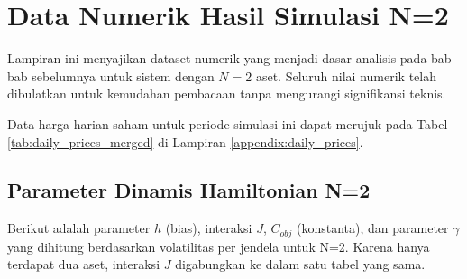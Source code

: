 \chapter{Data Numerik Hasil Simulasi N=2}
\label{appendix:numerical_data_n2}

Lampiran ini menyajikan dataset numerik yang menjadi dasar analisis pada bab-bab sebelumnya untuk sistem dengan $N=2$ aset. Seluruh nilai numerik telah dibulatkan untuk kemudahan pembacaan tanpa mengurangi signifikansi teknis.

Data harga harian saham untuk periode simulasi ini dapat merujuk pada Tabel \ref{tab:daily_prices_merged} di Lampiran \ref{appendix:daily_prices}.

\section{Parameter Dinamis Hamiltonian N=2}

Berikut adalah parameter $h$ (bias), interaksi $J$, $C_{obj}$ (konstanta), dan parameter $\gamma$ yang dihitung berdasarkan volatilitas per jendela untuk N=2. Karena hanya terdapat dua aset, interaksi $J$ digabungkan ke dalam satu tabel yang sama.

